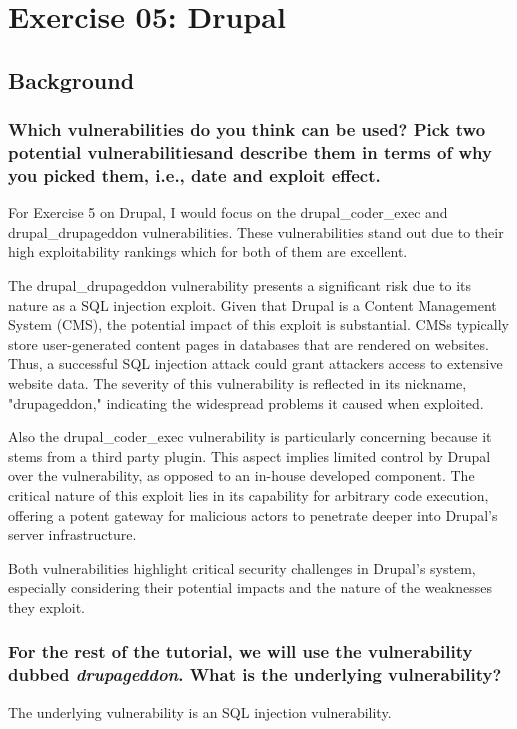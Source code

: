 \section{Exercise 05: Drupal}


\subsection{Background}

\subsubsection{Which vulnerabilities do you think can be used? Pick two potential vulnerabilitiesand describe them in terms of why you picked them, i.e., date and exploit effect.}
For Exercise 5 on Drupal, I would focus on the drupal\_coder\_exec and drupal\_drupageddon vulnerabilities.
These vulnerabilities stand out due to their high exploitability rankings which for both of them are excellent.

The drupal\_drupageddon vulnerability presents a significant risk due to its nature as a SQL injection exploit.
Given that Drupal is a Content Management System (CMS), the potential impact of this exploit is substantial.
CMSs typically store user-generated content pages in databases that are rendered on websites.
Thus, a successful SQL injection attack could grant attackers access to extensive website data.
The severity of this vulnerability is reflected in its nickname, "drupageddon," indicating the widespread problems it caused when exploited.

Also the drupal\_coder\_exec vulnerability is particularly concerning because it stems from a third party plugin.
This aspect implies limited control by Drupal over the vulnerability, as opposed to an in-house developed component.
The critical nature of this exploit lies in its capability for arbitrary code execution,
offering a potent gateway for malicious actors to penetrate deeper into Drupal's server infrastructure.

Both vulnerabilities highlight critical security challenges in Drupal's system, especially considering their potential impacts and the nature of the weaknesses they exploit.


\subsubsection{For the rest of the tutorial, we will use the vulnerability dubbed \textit{drupageddon}. What is the underlying vulnerability?}
The underlying vulnerability is an SQL injection vulnerability.

